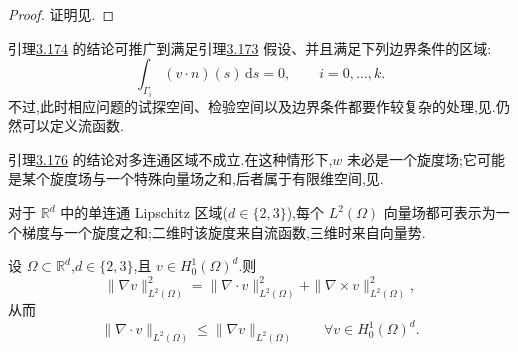 \begin{proof}
证明见\textcite[第 48 页]{GiraultRaviart1986}.
\end{proof}

\begin{note}[多连通区域]\label{note:helmholtz-multiply-connected}
引理\hyperref[lem:helmholtz-vector-potential-2d]{3.174} 的结论可推广到满足引理\hyperref[lem:helmholtz-scalar-potential]{3.173} 假设、并且满足下列边界条件的区域:
\[
  \int_{\Gamma_i}(v\cdot n)(s)\,\mathrm{d}s=0,
  \qquad i=0,\ldots,k.
\]
不过,此时相应问题的试探空间、检验空间以及边界条件都要作较复杂的处理,见\textcite[第 40 页]{GiraultRaviart1986}.仍然可以定义流函数.

引理\hyperref[lem:helmholtz-vector-potential-3d]{3.176} 的结论对多连通区域不成立.在这种情形下,$w$ 未必是一个旋度场;它可能是某个旋度场与一个特殊向量场之和,后者属于有限维空间,见\textcite[附录 I]{Temam1984}.
\end{note}

\begin{note}\label{note:helmholtz-simply-connected-summary}
对于 $\mathbb{R}^d$ 中的单连通 Lipschitz 区域($d\in\{2,3\}$),每个 $L^2(\Omega)$ 向量场都可表示为一个梯度与一个旋度之和;二维时该旋度来自流函数,三维时来自向量势.
\end{note}

\begin{lemma}\label{lem:divergence-by-gradient-h01}
设 $\Omega\subset\mathbb{R}^d$,$d\in\{2,3\}$,且 $v\in H_0^1(\Omega)^d$.则
\begin{equation}\label{eq:gradient-div-curl-identity}
  \|\nabla v\|_{L^2(\Omega)}^2
    =\|\nabla\cdot v\|_{L^2(\Omega)}^2
      +\|\nabla\times v\|_{L^2(\Omega)}^2,
\end{equation}
从而
\begin{equation}\label{eq:divergence-by-gradient-h01}
  \|\nabla\cdot v\|_{L^2(\Omega)}
    \le\|\nabla v\|_{L^2(\Omega)}
    \qquad\forall v\in H_0^1(\Omega)^d.
\end{equation}
\end{lemma}


